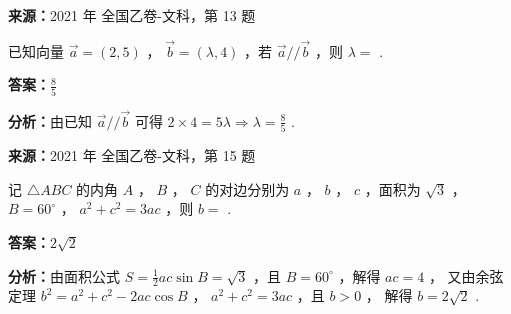 \begin{question}[points=5]
\textbf{来源：}2021 年 全国乙卷-文科，第 13 题\par
已知向量 $\vec{a} = (2,5)$ ， $\vec{b} = (\lambda, 4)$ ，若 $\vec{a} // \vec{b}$ ，则 $\lambda =$ .
\fillin[{$\frac{8}{5}$}]
\begin{solution}
\textbf{答案：}$\frac{8}{5}$

\textbf{分析：}由已知 $\vec{a} // \vec{b}$ 可得 $2 \times 4 = 5\lambda \Rightarrow \lambda = \frac{8}{5}$ .
\end{solution}
\end{question}

\begin{question}[points=5]
\textbf{来源：}2021 年 全国乙卷-文科，第 15 题\par
记 $\triangle ABC$ 的内角 $A$ ， $B$ ， $C$ 的对边分别为 $a$ ， $b$ ， $c$ ，面积为 $\sqrt{3}$ ， $B = 60^\circ$ ， $a^2 + c^2 = 3ac$ ，则 $b =$ .
\fillin[{$2\sqrt{2}$}]
\begin{solution}
\textbf{答案：}$2\sqrt{2}$

\textbf{分析：}由面积公式 $S = \frac{1}{2}ac\sin B = \sqrt{3}$ ，且 $B = 60^\circ$ ，解得 $ac = 4$ ，
又由余弦定理 $b^2 = a^2 + c^2 - 2ac\cos B$ ， $a^2 + c^2 = 3ac$ ，且 $b > 0$ ，
解得 $b = 2\sqrt{2}$ .
\end{solution}
\end{question}

